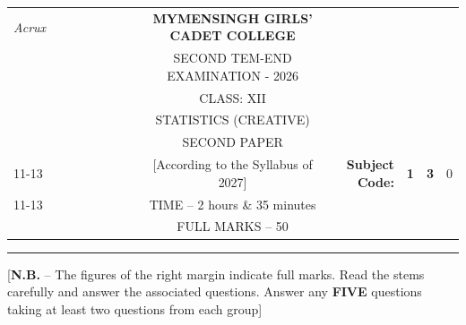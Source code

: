 \documentclass[12pt]{article}
\begin{document}
\begin{table}[]
\begin{tabular}{llllllllcllcl}
\textit{Acrux} &  &  &  &  &  &  &  & \textbf{MYMENSINGH GIRLS’ CADET COLLEGE} &                                             &                                 & \multicolumn{1}{l}{}            &                        \\
                 &  &  &  &  &  &  &  & SECOND TEM-END EXAMINATION - 2026          &                                             &                                 &                                 &                        \\
                 &  &  &  &  &  &  &  & CLASS: XII                               &                                             &                                 &                                 &                        \\
                 &  &  &  &  &  &  &  & STATISTICS (CREATIVE)                    &                                             &                                 &                                 &                        \\
                 &  &  &  &  &  &  &  & SECOND PAPER                             &                                             &                                 & \multicolumn{1}{r}{}            &                        \\ \cline{11-13} 
                 &  &  &  &  &  &  &  & [According to the Syllabus of 2027]      & \multicolumn{1}{r|}{\textbf{Subject Code:}} & \multicolumn{1}{l|}{\textbf{1}} & \multicolumn{1}{l|}{\textbf{3}} & \multicolumn{1}{l|}{0} \\ \cline{11-13} 
                 &  &  &  &  &  &  &  & TIME – 2 hours \& 35 minutes             &                                             &                                 & \multicolumn{1}{r}{}            &                        \\
                 &  &  &  &  &  &  &  & FULL MARKS – 50                          &                       
\end{tabular}
\end{table}

\vspace{-1cm}
\hrule

\begin{center}
[\textbf{N.B.} – The figures of the right margin indicate full marks. Read the stems carefully and answer the associated questions. Answer any \textbf{FIVE} questions taking at least two questions from each group]\\
\end{center}
\end{document}
